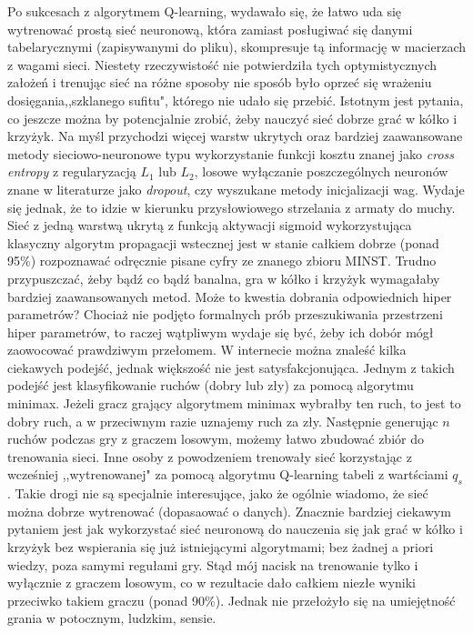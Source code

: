 \documentclass[licencjacka]{pracamgr}
\begin{document}
Po sukcesach z algorytmem Q-learning, wydawało się, że łatwo uda się wytrenować prostą sieć neuronową, która zamiast posługiwać się danymi tabelarycznymi (zapisywanymi do pliku), skompresuje tą informację w macierzach z wagami sieci. Niestety rzeczywistość nie potwierdziła tych optymistycznych założeń i trenując sieć na różne sposoby nie sposób było oprzeć się wrażeniu dosięgania,,szklanego sufitu", którego nie udało się przebić. Istotnym jest pytania, co jeszcze można by potencjalnie zrobić, żeby nauczyć sieć dobrze grać w kółko i krzyżyk.  Na myśl przychodzi więcej warstw ukrytych oraz bardziej zaawansowane metody  sieciowo-neuronowe  typu wykorzystanie funkcji kosztu znanej jako \textit{cross entropy} z regularyzacją $L_{1}$ lub $L_{2}$, losowe wyłączanie poszczególnych neuronów znane w literaturze jako \textit{dropout}, czy wyszukane metody inicjalizacji wag. Wydaje się jednak, że to idzie w kierunku przysłowiowego strzelania z armaty do muchy. Sieć z jedną warstwą ukrytą z funkcją aktywacji sigmoid wykorzystująca klasyczny algorytm propagacji wstecznej jest w stanie całkiem dobrze (ponad 95\%) rozpoznawać odręcznie pisane cyfry ze znanego zbioru MINST\cite{nn}. Trudno przypuszczać, żeby bądź co bądź banalna, gra w kółko i krzyżyk wymagałaby bardziej zaawansowanych metod. Może to kwestia dobrania odpowiednich hiper parametrów? Chociaż nie podjęto formalnych  prób przeszukiwania przestrzeni hiper parametrów, to raczej wątpliwym wydaje się być, żeby ich dobór mógł zaowocować prawdziwym przełomem.  W internecie można znaleść kilka ciekawych podejść, jednak większość  nie jest satysfakcjonująca. Jednym z takich podejść jest klasyfikowanie ruchów (dobry lub zły) za pomocą algorytmu minimax. Jeżeli gracz grający algorytmem minimax wybrałby ten ruch, to jest to dobry ruch, a w przeciwnym razie uznajemy ruch za zły. Następnie generując $n$ ruchów podczas gry z graczem losowym, możemy łatwo zbudować zbiór do trenowania sieci. Inne osoby z powodzeniem trenowały sieć korzystając z wcześniej ,,wytrenowanej" za pomocą algorytmu Q-learning tabeli z wartściami $q_{s}$.  Takie drogi nie są specjalnie interesujące, jako że ogólnie wiadomo, że sieć można dobrze wytrenować (dopasaować o danych). Znacznie bardziej ciekawym pytaniem jest jak wykorzystać sieć neuronową do nauczenia się  jak grać w kółko i krzyżyk bez wspierania się już istniejącymi algorytmami; bez żadnej a priori wiedzy, poza samymi regułami gry. Stąd mój nacisk na trenowanie tylko i wyłącznie z graczem losowym, co w rezultacie dało całkiem niezłe wyniki przeciwko takiem graczu (ponad 90\%).  Jednak nie przełożyło się na umiejętność grania w potocznym, ludzkim, sensie. \\
\end{document}
